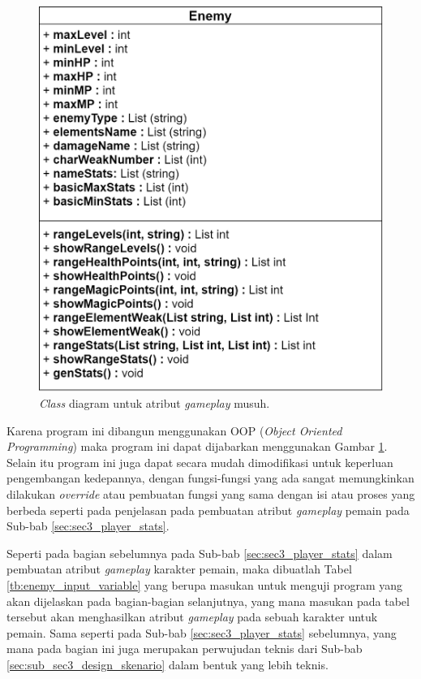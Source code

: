 \begin{figure} [!h] \centering
	\includegraphics[scale=0.2]{img/enemy_uml.png}
	\caption{\textit{Class} diagram untuk atribut \textit{gameplay} musuh.}
	\label{fig:enemy_uml}
\end{figure}

Karena program ini dibangun menggunakan OOP (\textit{Object Oriented Programming}) maka program ini dapat dijabarkan menggunakan Gambar \ref{fig:enemy_uml}. Selain itu program ini juga dapat secara mudah dimodifikasi untuk keperluan pengembangan kedepannya, dengan fungsi-fungsi yang ada sangat memungkinkan dilakukan \textit{override} atau pembuatan fungsi yang sama dengan isi atau proses yang berbeda seperti pada penjelasan pada pembuatan atribut \textit{gameplay} pemain pada Sub-bab \ref{sec:sec3_player_stats}. 
\vspace{1ex}

Seperti pada bagian sebelumnya pada Sub-bab \ref{sec:sec3_player_stats} dalam pembuatan atribut \textit{gameplay} karakter pemain, maka dibuatlah Tabel \ref{tb:enemy_input_variable} yang berupa masukan untuk menguji program yang akan dijelaskan pada bagian-bagian selanjutnya, yang mana masukan pada tabel tersebut akan menghasilkan atribut \textit{gameplay} pada sebuah karakter untuk pemain. Sama seperti pada Sub-bab \ref{sec:sec3_player_stats} sebelumnya, yang mana pada bagian ini juga merupakan perwujudan teknis dari Sub-bab \ref{sec:sub_sec3_design_skenario} dalam bentuk yang lebih teknis.
\vspace{-1ex}

